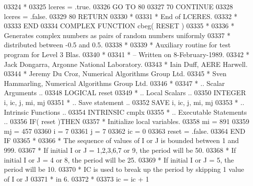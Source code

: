 \begin{DoxyCode}
03324 \textcolor{comment}{*}
03325       lceres = .true.
03326       \textcolor{keywordflow}{GO TO} 80
03327    70 \textcolor{keywordflow}{CONTINUE}
03328       lceres = .false.
03329    80 \textcolor{keywordflow}{RETURN}
03330 \textcolor{comment}{*}
03331 \textcolor{comment}{*     End of LCERES.}
03332 \textcolor{comment}{*}
03333 \textcolor{keyword}{      END}
03334 \textcolor{keyword}{      COMPLEX }\textcolor{keyword}{FUNCTION }cbeg( RESET )
03335 \textcolor{comment}{*}
03336 \textcolor{comment}{*  Generates complex numbers as pairs of random numbers uniformly}
03337 \textcolor{comment}{*  distributed between -0.5 and 0.5.}
03338 \textcolor{comment}{*}
03339 \textcolor{comment}{*  Auxiliary routine for test program for Level 3 Blas.}
03340 \textcolor{comment}{*}
03341 \textcolor{comment}{*  -- Written on 8-February-1989.}
03342 \textcolor{comment}{*     Jack Dongarra, Argonne National Laboratory.}
03343 \textcolor{comment}{*     Iain Duff, AERE Harwell.}
03344 \textcolor{comment}{*     Jeremy Du Croz, Numerical Algorithms Group Ltd.}
03345 \textcolor{comment}{*     Sven Hammarling, Numerical Algorithms Group Ltd.}
03346 \textcolor{comment}{*}
03347 \textcolor{comment}{*     .. Scalar Arguments ..}
03348       \textcolor{keywordtype}{LOGICAL}            reset
03349 \textcolor{comment}{*     .. Local Scalars ..}
03350       \textcolor{keywordtype}{INTEGER}            i, ic, j, mi, mj
03351 \textcolor{comment}{*     .. Save statement ..}
03352       \textcolor{keywordtype}{SAVE}               i, ic, j, mi, mj
03353 \textcolor{comment}{*     .. Intrinsic Functions ..}
03354       \textcolor{keywordtype}{INTRINSIC}          cmplx
03355 \textcolor{comment}{*     .. Executable Statements ..}
03356       \textcolor{keywordflow}{IF}( reset )\textcolor{keywordflow}{THEN}
03357 \textcolor{comment}{*        Initialize local variables.}
03358          mi = 891
03359          mj = 457
03360          i = 7
03361          j = 7
03362          ic = 0
03363          reset = .false.
03364 \textcolor{keywordflow}{      END IF}
03365 \textcolor{comment}{*}
03366 \textcolor{comment}{*     The sequence of values of I or J is bounded between 1 and 999.}
03367 \textcolor{comment}{*     If initial I or J = 1,2,3,6,7 or 9, the period will be 50.}
03368 \textcolor{comment}{*     If initial I or J = 4 or 8, the period will be 25.}
03369 \textcolor{comment}{*     If initial I or J = 5, the period will be 10.}
03370 \textcolor{comment}{*     IC is used to break up the period by skipping 1 value of I or J}
03371 \textcolor{comment}{*     in 6.}
03372 \textcolor{comment}{*}
03373       ic = ic + 1

\end{DoxyCode}
